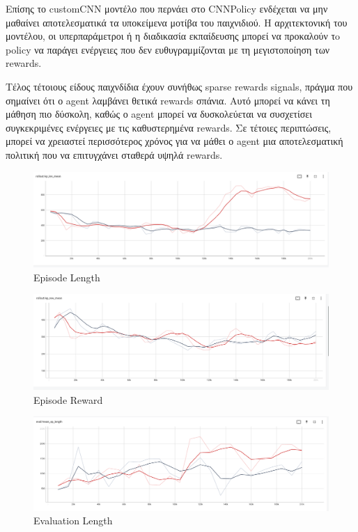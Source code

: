 Επίσης το customCNN μοντέλο που περνάει στο CNNPolicy ενδέχεται να μην μαθαίνει αποτελεσματικά τα υποκείμενα μοτίβα του παιχνιδιού. Η αρχιτεκτονική του μοντέλου, οι υπερπαράμετροι ή η διαδικασία εκπαίδευσης μπορεί να προκαλούν τo policy να παράγει ενέργειες που δεν ευθυγραμμίζονται με τη μεγιστοποίηση των rewards.

Τέλος τέτοιους είδους παιχνδίδια έχουν συνήθως sparse rewards signals, πράγμα που σημαίνει ότι ο agent λαμβάνει θετικά rewards σπάνια. Αυτό μπορεί να κάνει τη μάθηση πιο δύσκολη, καθώς ο agent μπορεί να δυσκολεύεται να συσχετίσει συγκεκριμένες ενέργειες με τις καθυστερημένα rewards. Σε τέτοιες περιπτώσεις, μπορεί να χρειαστεί περισσότερος χρόνος για να μάθει ο agent μια αποτελεσματική πολιτική που να επιτυγχάνει σταθερά υψηλά rewards.





\begin{figure}[ht]
	\centering
	\includegraphics[width=1\linewidth]{Results/A2C_MLP/ep_length.png}
	\caption{ Episode Length}
	\label{f:g13}	
\end{figure}


\begin{figure}[ht]
	\centering
	\includegraphics[width=1\linewidth]{Results/A2C_MLP/ep_reward.png}
	\caption{ Episode Reward }
	\label{f:g14}	
\end{figure}

\begin{figure}[ht]
	\centering
	\includegraphics[width=1\linewidth]{Results/A2C_MLP/eval_length.png}
	\caption{ Evaluation Length}
	\label{f:g15}	
\end{figure}

